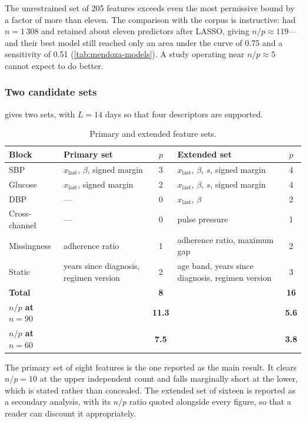 \documentclass[12pt,a4paper,oneside]{report}
\begin{document}
The unrestrained set of 205 features exceeds even the most permissive bound by a factor of more than eleven. The comparison with the corpus is instructive: \textcite{mendoza2025} had $n = 1\,308$ and retained about eleven predictors after LASSO, giving $n/p \approx 119$---and their best model still reached only an area under the curve of 0.75 and a sensitivity of 0.51 (\cref{tab:mendoza-models}). A study operating near $n/p \approx 5$ cannot expect to do better.

\subsubsection{Two candidate sets}\label{sec:candidate-sets}

 gives two sets, with $L = 14$ days so that four descriptors are supported.

\begin{table}[htbp]
\centering\footnotesize
\caption{Primary and extended feature sets.}\label{tab:feature-sets}
\begin{tabularx}{\textwidth}{@{}>{\raggedright\arraybackslash}p{2.1cm} X c X c@{}}
\toprule
\textbf{Block} & \textbf{Primary set} & \textbf{$p$} & \textbf{Extended set} & \textbf{$p$} \\
\midrule
SBP & $x_{\text{last}}$, $\beta$, signed margin & 3 & $x_{\text{last}}$, $\beta$, $s$, signed margin & 4 \\
Glucose & $x_{\text{last}}$, signed margin & 2 & $x_{\text{last}}$, $\beta$, $s$, signed margin & 4 \\
DBP & --- & 0 & $x_{\text{last}}$, $\beta$ & 2 \\
Cross-channel & --- & 0 & pulse pressure & 1 \\
Missingness & adherence ratio & 1 & adherence ratio, maximum gap & 2 \\
Static & years since diagnosis, regimen version & 2 & age band, years since diagnosis, regimen version & 3 \\
\midrule
\textbf{Total} & & \textbf{8} & & \textbf{16} \\
\textbf{$n/p$ at $n=90$} & & \textbf{11.3} & & \textbf{5.6} \\
\textbf{$n/p$ at $n=60$} & & \textbf{7.5} & & \textbf{3.8} \\
\bottomrule
\end{tabularx}
\end{table}

The primary set of eight features is the one reported as the main result. It clears $n/p = 10$ at the upper independent count and falls marginally short at the lower, which is stated rather than concealed. The extended set of sixteen is reported as a secondary analysis, with its $n/p$ ratio quoted alongside every figure, so that a reader can discount it appropriately.
\end{document}

